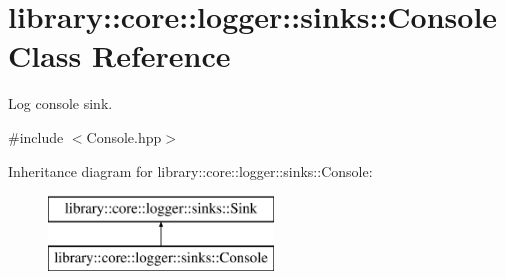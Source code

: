 \hypertarget{classlibrary_1_1core_1_1logger_1_1sinks_1_1Console}{}\section{library\+:\+:core\+:\+:logger\+:\+:sinks\+:\+:Console Class Reference}
\label{classlibrary_1_1core_1_1logger_1_1sinks_1_1Console}


Log console sink.  




{\ttfamily \#include $<$Console.\+hpp$>$}

Inheritance diagram for library\+:\+:core\+:\+:logger\+:\+:sinks\+:\+:Console\+:\begin{figure}[H]
\begin{center}
\leavevmode
\includegraphics[height=2.000000cm]{classlibrary_1_1core_1_1logger_1_1sinks_1_1Console}
\end{center}
\end{figure}

